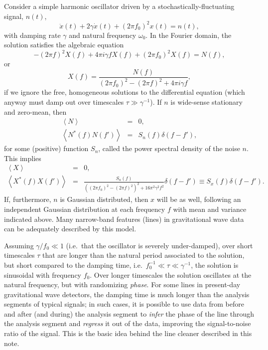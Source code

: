 \documentclass[modern]{aastex631}
\begin{document}
Consider a simple harmonic oscillator driven by a stochastically-fluctuating
signal, $n(t)$,
\begin{equation}
    \ddot{x}(t) + 2\gamma\dot{x}(t) + \left( 2 \pi f_0 \right)^2 x(t) = n(t),
\end{equation}
with damping rate $\gamma$ and natural frequency $\omega_0$.  In the Fourier
domain, the solution satisfies the algebraic equation 
\begin{equation}
    -\left( 2 \pi f \right)^2 X(f) + 4 \pi i\gamma f X(f) + \left( 2 \pi f_0 \right)^2 X(f) = N(f),
\end{equation}
or
\begin{equation}
    X(f) = \frac{N(f)}{\left( 2 \pi f_0 \right)^2 - \left( 2 \pi f \right)^2 + 4 \pi i\gamma f},
\end{equation}
if we ignore the free, homogeneous solutions to the differential equation (which
anyway must damp out over timescales $\tau \gg \gamma^{-1}$).  If $n$ is
wide-sense stationary and zero-mean, then 
\begin{eqnarray}
    \left\langle N \right\rangle & = & 0, \\
    \left\langle N^*(f)N(f') \right\rangle & = &
    S_n(f) \delta(f - f'),
\end{eqnarray}
for some (positive) function $S_n$, called the power spectral density of the
noise $n$.  This implies 
\begin{eqnarray}
    \left\langle X \right\rangle & = & 0, \\
    \left\langle X^*(f)X(f') \right\rangle & = & \frac{S_n(f)}{\left(\left( 2 \pi f_0 \right)^2 - \left( 2 \pi f \right)^2\right)^2 + 16 \pi^2 \gamma^2 f^2}\delta(f - f') \equiv S_x(f) \delta\left( f - f' \right).
\end{eqnarray}
If, furthermore, $n$ is Gaussian distributed, then $x$ will be as well,
following an independent Gaussian distribution at each frequency $f$ with mean
and variance indicated above.  Many narrow-band features (lines) in
gravitational wave data can be adequately described by this model.  

Assuming $\gamma / f_0 \ll 1$ (i.e.\ that the oscillator is severely
under-damped), over short timescales $\tau$ that are longer than the natural
period associated to the solution, but short compared to the damping time, i.e.\
$f_0^{-1} \ll \tau \ll \gamma^{-1}$, the solution is sinusoidal with frequency
$f_0$.  Over longer timescales the solution oscillates at the natural frequency,
but with randomizing \emph{phase}. For some lines in present-day gravitational
wave detectors, the damping time is much longer than the analysis segments of
typical signals; in such cases, it is possible to use data from before and after
(and during) the analysis segment to \emph{infer} the phase of the line through
the analysis segment and \emph{regress} it out of the data, improving the
signal-to-noise ratio of the signal.  This is the basic idea behind the line
cleaner described in this note.
\end{document}
